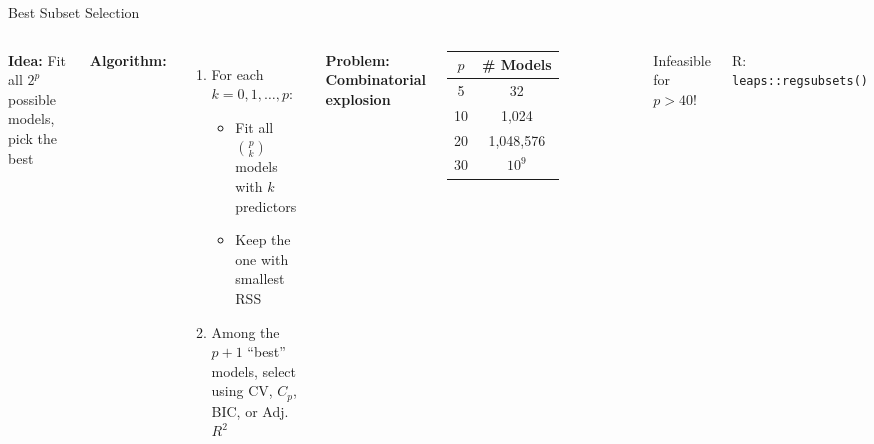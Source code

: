 \documentclass[aspectratio=169, 11pt]{beamer}
\begin{document}
\begin{frame}{Best Subset Selection}
\begin{columns}
\textbf{Idea:} Fit all $2^p$ possible models, pick the best

\textbf{Algorithm:}
\begin{enumerate}
  \item For each $k = 0, 1, \ldots, p$:
  \begin{itemize}
    \item Fit all $\binom{p}{k}$ models with $k$ predictors
    \item Keep the one with smallest RSS
  \end{itemize}
  \item Among the $p+1$ ``best'' models, select using CV, $C_p$, BIC, or Adj.~$R^2$
\end{enumerate}
\textbf{Problem: Combinatorial explosion}
\begin{tabular}{cc}
\toprule
$p$ & \# Models \\
\midrule
5 & 32 \\
10 & 1,024 \\
20 & \textcolor{softred}{1,048,576} \\
30 & \textcolor{softred}{$10^9$} \\
\bottomrule
\end{tabular}
\vspace{0.3em}
\textcolor{softred}{Infeasible for $p > 40$!}

\footnotesize R: \texttt{leaps::regsubsets()}
\end{columns}
\end{frame}
\end{document}
